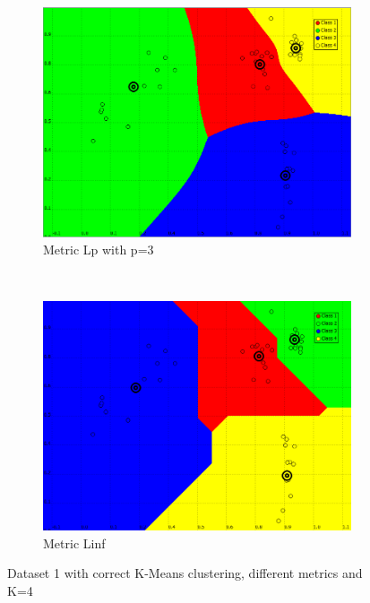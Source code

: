 \documentclass[a4paper,10pt]{article}
\begin{document}
\begin{figure}[H]
\begin{subfigure}[t]{0.2\textwidth}
      \centering
      \includegraphics[width=\textwidth]{pictures/dataset_1_Kmeans-4K-L3}
      \caption{Metric Lp with p=3}
      \label{fig:dataset_1_Kmeans-4K-L3}
     \end{subfigure}
      ~
    \begin{subfigure}[t]{0.2\textwidth}
      \centering
      \includegraphics[width=\textwidth]{pictures/dataset_1_Kmeans-4K-Linf}
      \caption{Metric Linf}
      \label{fig:dataset_1_Kmeans-4K-Linf}
     \end{subfigure}
     \caption{Dataset 1 with correct K-Means clustering, different metrics and K=4}
     \label{fig:good_kmeans}
\end{figure}
\end{document}

